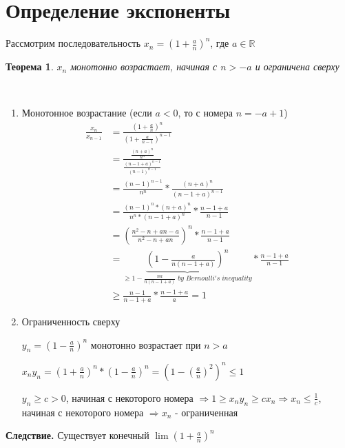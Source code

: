 \documentclass[12pt,letterpaper]{report}
\makeatletter
\newtheorem{theorem}{Теорема}
\renewenvironment{proof}[1][\proofname]{%
   \par\pushQED{\qed}\normalfont%
   \topsep6\p@\@plus6\p@\relax
   \trivlist\item[\hskip\labelsep\bfseries#1\@addpunct{.}]%
   \ignorespaces
}{%
   \popQED\endtrivlist\@endpefalse
}
\makeatother
\begin{document}
\section{Определение экспоненты}
Рассмотрим последовательность $x_n = (1 + \frac{a}{n})^n$, где $a \in \mathbb{R}$
\begin{theorem}
$x_n$ монотонно возрастает, начиная с $n > -a$ и ограничена сверху
\end{theorem}
\begin{proof} \quad \\
    \begin{enumerate}
    \item Монотонное возрастание (если $a < 0$, то с номера $n = -a + 1$)
    \begin{equation*}
        \begin{split}
            \frac{x_n}{x_{n - 1}} &= \frac{(1 + \frac{a}{n})^n}{(1 + \frac{a}{n - 1})^{n - 1}} \\ 
            &= \frac{\frac{(n + a)^n}{n^n}}{\frac{(n - 1 + a)^{n - 1}}{(n - 1)^{n - 1}}} \\ 
            &= \frac{(n - 1)^{n - 1}}{n^n} * \frac{(n + a)^n}{(n - 1 + a)^{n - 1}} \\
            &= \frac{(n - 1)^n * (n + a)^n}{n^n * (n - 1 + a)^n } * \frac{n - 1 + a}{n - 1} \\
            &= (\frac{n^2 - n + an - a}{n^2 - n + an})^n * \frac{n - 1 + a}{n - 1} \\ 
            &= \underbrace{(1 - \frac{a}{n(n - 1 + a)})^n}_{\geqslant 1 - \frac{na}{n(n - 1 + a)} \;by\; Bernoulli's\; inequality} * \frac{n - 1 + a}{n - 1} \\
            &\geqslant\frac{n - 1}{n - 1 + a} * \frac{n - 1 + a}{a} = 1
        \end{split}
    \end{equation*}
    \item Ограниченность сверху
    
    $y_n = (1 - \frac{a}{n})^n$ монотонно возрастает при $n > a$ 
    
    $x_ny_n = (1 + \frac{a}{n})^n * (1 - \frac{a}{n})^n = (1 - (\frac{a}{n})^2)^n \leqslant 1$
    
    $y_n \geqslant c > 0$, начиная с некоторого номера $\Rightarrow 1 \geqslant x_ny_n \geqslant cx_n \Rightarrow x_n \leqslant \frac{1}{c}$, начиная с некоторого номера $\Rightarrow x_n$ - ограниченная
    \end{enumerate}
\end{proof}
\textbf{Следствие.} Существует конечный $\lim (1 + \frac{a}{n})^n$ 
\end{document}
